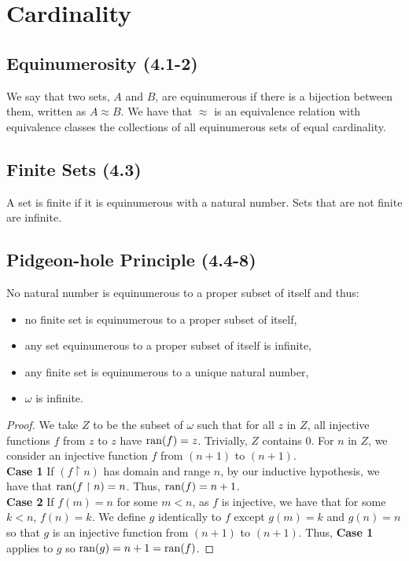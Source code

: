 \section{Cardinality}

\subsection{Equinumerosity (4.1-2)} \label{4.1} \label{4.2}

We say that two sets, $A$ and $B$, are equinumerous if there is a bijection 
between them, written as $A \approx B$.
We have that $\approx$ is an equivalence relation with equivalence classes
the collections of all equinumerous sets of equal cardinality.

\subsection{Finite Sets (4.3)} \label{4.3}

A set is finite if it is equinumerous with a natural number. Sets that are
not finite are infinite.

\subsection{Pidgeon-hole Principle (4.4-8)}
\label{4.4} \label{4.5} \label{4.6} \label{4.7} \label{4.8}

No natural number is equinumerous to a proper subset of itself and thus: 
\begin{itemize}
    \item no finite set is equinumerous to a proper subset of itself,
    \item any set equinumerous to a proper subset of itself is infinite,
    \item any finite set is equinumerous to a unique natural number,
    \item $\omega$ is infinite.
\end{itemize}

\begin{proof}
    We take $Z$ to be the subset of $\omega$ such that for all $z$ in $Z$,
    all injective functions $f$ from $z$ to $z$ have $\operatorname{ran}(f) = z$.
    Trivially, $Z$ contains $0$. For $n$ in $Z$, we consider an injective function
    $f$ from $(n + 1)$ to $(n + 1)$.
    \\[\baselineskip]
    \textbf{Case 1} If $(f \upharpoonright n)$ has domain and range $n$,
    by our inductive hypothesis, we have that $\operatorname{ran}(f \upharpoonright n) = n$. 
    Thus, $\operatorname{ran}(f) = n + 1$.
    \\[\baselineskip]
    \textbf{Case 2} If $f(m) = n$ for some $m < n$,
    as $f$ is injective, we have that for some $k < n$, $f(n) = k$. 
    We define $g$ identically to $f$ except $g(m) = k$ and $g(n) = n$
    so that $g$ is an injective function from $(n + 1)$ to $(n + 1)$. 
    Thus, \textbf{Case 1} applies to $g$ so $\operatorname{ran}(g) = n + 1 = \operatorname{ran}(f)$.
\end{proof}

